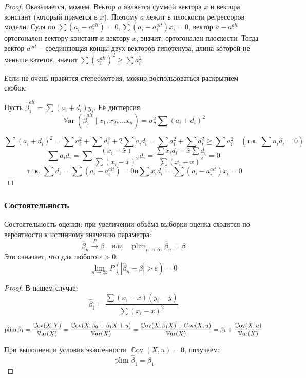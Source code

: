 \documentclass[12pt]{article}
\DeclareMathOperator{\Cov}{\mathbb{C}ov}
\DeclareMathOperator{\Var}{\mathbb{V}ar}
\DeclareMathOperator{\plim}{plim}
\newcommand{\hb}{\hat{\beta}}
\begin{document}
\begin{proof}

    Оказывается, можем. Вектор $a$ является суммой вектора $x$ и вектора констант (который прячется в $\bar{x}$). Поэтому $a$ лежит в плоскости регрессоров модели. Судя по $\sum (a_i - a_i^{alt}) = 0, \sum (a_i - a_i^{alt})x_i = 0$, вектор $a - a^{alt}$ ортогонален вектору констант и вектору $x$, значит, ортогонален плоскости. Тогда вектор $a^{alt}$ -- соединяющая концы двух векторов гипотенуза, длина которой не меньше катетов, значит \( \sum (a_i^{alt})^2 \ge \sum a_i^2.\)
    
    Если не очень нравится стереометрия, можно воспользоваться раскрытием скобок:

    Пусть \( \hb_1^{alt} = \sum (a_i + d_i) y_i \). Её дисперсия:
    \[ \Var(\hb^{alt}_1 \mid x_1, x_2, \ldots x_n) = \sigma_u^2 \sum (a_i + d_i)^2 \]
    
    \[ \sum (a_i + d_i)^2 = \sum a_i^2 + \sum d_i^2 + 2 \sum a_i d_i = \sum a_i^2 + \sum d_i^2 \geq \sum a_i^2 \quad (\text{т.к. } \sum a_i d_i = 0)  \]
    \[\sum a_i d_i = \sum \frac{(x_i - \bar{x})}{\sum (x_i - \bar{x})^2} d_i = \frac{\sum x_i d_i - \bar{x} \sum d_i}{\sum (x_i - \bar{x})^2} = 0\] 
    \[ \text{ т. к. } \sum d_i = \sum (a_i - a_i^{alt})  = 0 и \sum x_i d_i = \sum (a_i - a_i^{alt}) x_i = 0 \]
\end{proof}
    
\subsubsection*{Состоятельность}

    Состоятельность оценки: при увеличении объёма выборки оценка сходится по вероятности к истинному значению параметра:
    \[ \hat{\beta}_n \xrightarrow{P} \beta \quad \text{или} \quad \plim_{n \to \infty} \hat{\beta}_n = \beta \]
    Это означает, что для любого \( \varepsilon > 0 \):
    \[ \lim_{n \to \infty} P(|\hat{\beta}_n - \beta| > \varepsilon) = 0 \]

    \begin{proof} В нашем случае:
    \[ \hat{\beta}_1 = \frac{\sum (x_i - \bar{x})(y_i - \bar{y})}{\sum (x_i - \bar{x})^2} \]



    \[\plim \hb_1 = \frac{\Cov(X, Y)}{\Var(X)} = \frac{\Cov(X, \beta_0 + \beta_1 X + u)}{\Var(X)} \\
    = \frac{\Cov(X, \beta_1 X) + Cov(X, u)}{\Var(X)} = \beta_1 + \frac{\Cov(X, u)}{\Var(X)}\]
    
    При выполнении условия экзогенности \( \Cov(X, u) = 0 \), получаем:
\[ \plim \hb_1 = \beta_1 \]
    \end{proof}
\end{document}
